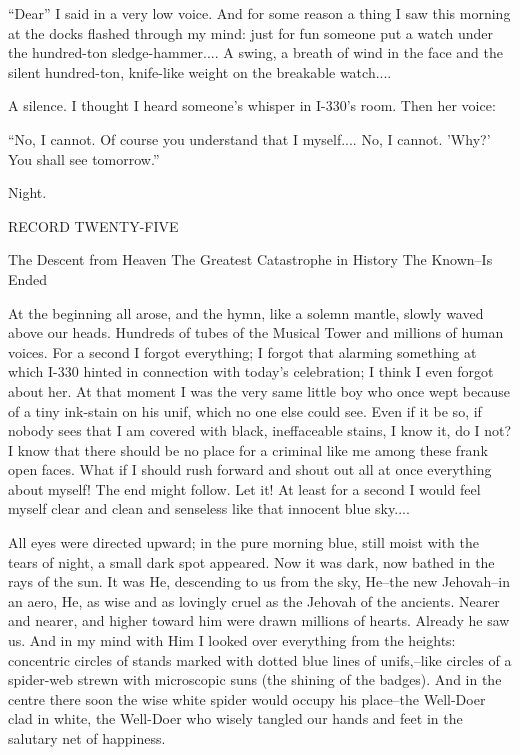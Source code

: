\documentclass[11pt,openany]{book}
\begin{document}
``Dear'' I said in a very low voice. And for some reason a thing I saw this morning at the docks flashed through my mind: just for fun someone put a watch under the hundred-ton sledge-hammer.... A swing, a breath of wind in the face and the silent hundred-ton, knife-like weight on the breakable watch....

A silence. I thought I heard someone's whisper in I-330's room. Then her voice:

``No, I cannot. Of course you understand that I myself.... No, I cannot. 'Why?' You shall see tomorrow.''

Night.

\begin{center}\textsc{RECORD TWENTY-FIVE}\end{center}

The Descent from Heaven The Greatest Catastrophe in History The Known--Is Ended

At the beginning all arose, and the hymn, like a solemn mantle, slowly waved above our heads. Hundreds of tubes of the Musical Tower and millions of human voices. For a second I forgot everything; I forgot that alarming something at which I-330 hinted in connection with today's celebration; I think I even forgot about her. At that moment I was the very same little boy who once wept because of a tiny ink-stain on his unif, which no one else could see. Even if it be so, if nobody sees that I am covered with black, ineffaceable stains, I know it, do I not? I know that there should be no place for a criminal like me among these frank open faces. What if I should rush forward and shout out all at once everything about myself! The end might follow. Let it! At least for a second I would feel myself clear and clean and senseless like that innocent blue sky....

All eyes were directed upward; in the pure morning blue, still moist with the tears of night, a small dark spot appeared. Now it was dark, now bathed in the rays of the sun. It was He, descending to us from the sky, He--the new Jehovah--in an aero, He, as wise and as lovingly cruel as the Jehovah of the ancients. Nearer and nearer, and higher toward him were drawn millions of hearts. Already he saw us. And in my mind with Him I looked over everything from the heights: concentric circles of stands marked with dotted blue lines of unifs,--like circles of a spider-web strewn with microscopic suns (the shining of the badges). And in the centre there soon the wise white spider would occupy his place--the Well-Doer clad in white, the Well-Doer who wisely tangled our hands and feet in the salutary net of happiness.
\end{document}
